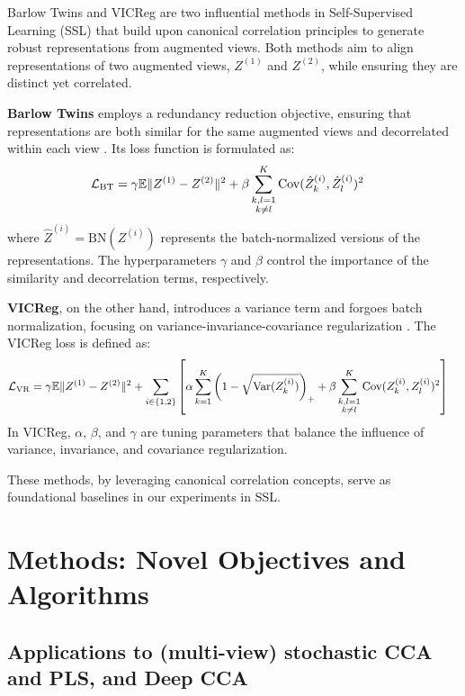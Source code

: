 Barlow Twins and VICReg are two influential methods in Self-Supervised Learning (SSL) that build upon canonical correlation principles to generate robust representations from augmented views. Both methods aim to align representations of two augmented views, \( Z^{(1)} \) and \( Z^{(2)} \), while ensuring they are distinct yet correlated.

\textbf{Barlow Twins} employs a redundancy reduction objective, ensuring that representations are both similar for the same augmented views and decorrelated within each view \citep{zbontar2021barlow}. Its loss function is formulated as:
\begin{align}
    \mathcal{L}_\text{BT} &= \gamma \mathbb{E} \lVert Z^{(1)} - Z^{(2)}\rVert^2 + \beta \sum_{\substack{k,l=1 \\ k \neq l}}^K \mathrm{Cov}(\hat{Z}^{(i)}_k, \hat{Z}^{(i)}_l)^2 \label{eq:bt}
\end{align}
where \( \hat{Z}^{(i)} = \text{BN}(Z^{(i)}) \) represents the batch-normalized versions of the representations. The hyperparameters \( \gamma \) and \( \beta \) control the importance of the similarity and decorrelation terms, respectively.

\textbf{VICReg}, on the other hand, introduces a variance term and forgoes batch normalization, focusing on variance-invariance-covariance regularization \citep{bardes2021vicreg}. The VICReg loss is defined as:
\begin{align}
    \mathcal{L}_\text{VR} &= \gamma \mathbb{E} \lVert Z^{(1)} - Z^{(2)}\rVert^2 + \sum_{i \in \{1,2\}} \left[\alpha \sum_{k=1}^K \left(1 - \sqrt{\mathrm{Var}(Z^{(i)}_k)}\right)_+ + \beta \sum_{\substack{k,l=1 \\ k \neq l}}^K \mathrm{Cov}(Z^{(i)}_k, Z^{(i)}_l)^2 \right] \label{eq:vicreg}
\end{align}
In VICReg, \( \alpha \), \( \beta \), and \( \gamma \) are tuning parameters that balance the influence of variance, invariance, and covariance regularization.

These methods, by leveraging canonical correlation concepts, serve as foundational baselines in our experiments in SSL.

\section{Methods: Novel Objectives and Algorithms}\label{sec:contributions}

\subsection{Applications to (multi-view) stochastic CCA and PLS, and Deep CCA}

